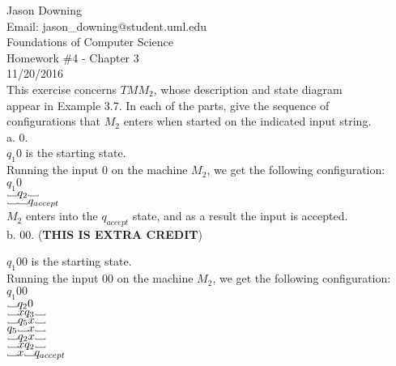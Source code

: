 \documentclass[12pt]{article}
\newcommand\Vtextvisiblespace[1][.8em]{%
	\mbox{\kern.07em\vrule height.3ex}%
	\vbox{\hrule width#1}%
	\hbox{\vrule height.3ex}}
\begin{document}
\noindent
Jason Downing \\
Email: jason\_downing@student.uml.edu \\
Foundations of Computer Science \\
Homework \#4 - Chapter 3 \\
11/20/2016 \\


 This exercise concerns $TM M_2$, whose description and state diagram \\
appear in Example 3.7. In each of the parts, give the sequence of \\
configurations that $M_2$ enters when started on the indicated input string. \\

a. 0. \\

$q_1 0$ is the starting state. \\
Running the input 0 on the machine $M_2$, we get the following configuration: \\

$q_1 0$ \\
$\Vtextvisiblespace q_2 \Vtextvisiblespace$ \\
$\Vtextvisiblespace  \Vtextvisiblespace q_{accept}$  \\
$M_2$ enters into the $q_{accept}$ state, and as a result the input is accepted. \\

b. 00. (\textbf{THIS IS EXTRA CREDIT})

$q_1 00$ is the starting state. \\
Running the input 00 on the machine $M_2$, we get the following configuration: \\

$                            q_1 00$ \\
$ \Vtextvisiblespace         q_2  0$ \\
$ \Vtextvisiblespace x       q_3  \Vtextvisiblespace $ \\
$ \Vtextvisiblespace         q_5  x  \Vtextvisiblespace$ \\
$                            q_5 \Vtextvisiblespace x  \Vtextvisiblespace$ \\
$ \Vtextvisiblespace         q_2  x  \Vtextvisiblespace$ \\
$ \Vtextvisiblespace x       q_2 \Vtextvisiblespace $ \\
$ \Vtextvisiblespace x  \Vtextvisiblespace q_{accept} $ \\
\end{document}
